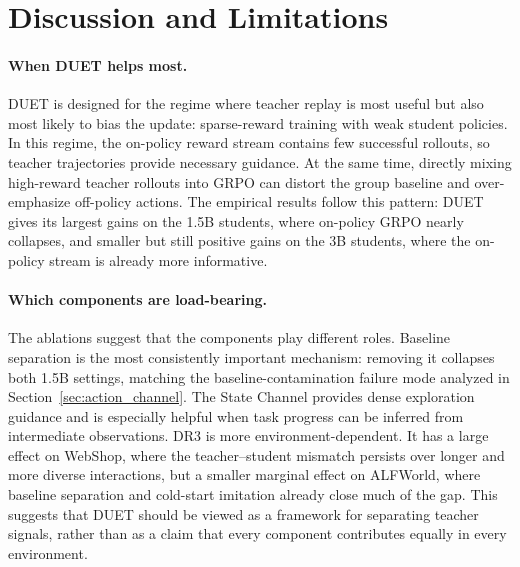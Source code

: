 
\section{Discussion and Limitations}
\label{sec:discussion}

\paragraph{When DUET helps most.}
DUET is designed for the regime where teacher replay is most useful but also most likely to bias the update: sparse-reward training with weak student policies.
In this regime, the on-policy reward stream contains few successful rollouts, so teacher trajectories provide necessary guidance.
At the same time, directly mixing high-reward teacher rollouts into GRPO can distort the group baseline and over-emphasize off-policy actions.
The empirical results follow this pattern: DUET gives its largest gains on the 1.5B students, where on-policy GRPO nearly collapses, and smaller but still positive gains on the 3B students, where the on-policy stream is already more informative.

\paragraph{Which components are load-bearing.}
The ablations suggest that the components play different roles.
Baseline separation is the most consistently important mechanism: removing it collapses both 1.5B settings, matching the baseline-contamination failure mode analyzed in Section~\ref{sec:action_channel}.
The State Channel provides dense exploration guidance and is especially helpful when task progress can be inferred from intermediate observations.
DR3 is more environment-dependent.
It has a large effect on WebShop, where the teacher--student mismatch persists over longer and more diverse interactions, but a smaller marginal effect on ALFWorld, where baseline separation and cold-start imitation already close much of the gap.
This suggests that DUET should be viewed as a framework for separating teacher signals, rather than as a claim that every component contributes equally in every environment.

